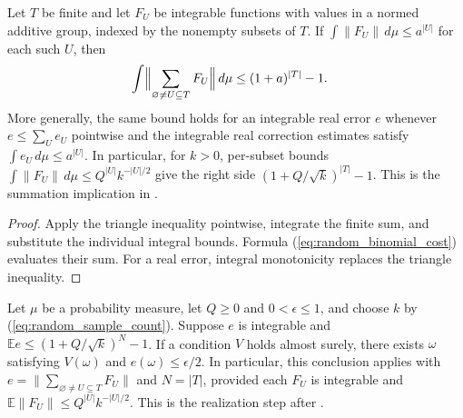 \begin{theorem}\label{thm:random_expected_corrections}
    \leanok
    Let $T$ be finite and let $F_U$ be integrable functions with values in a
    normed additive group, indexed by the nonempty subsets of $T$.
    If $\int\lVert F_U\rVert\,d\mu\leq a^{|U|}$ for each such $U$, then
    \begin{align}
        \int\Bigl\lVert\sum_{\varnothing\neq U\subseteq T}F_U\Bigr\rVert\,d\mu
         & \leq(1+a)^{|T|}-1.
        \label{eq:random_expected_corrections}
    \end{align}
    More generally, the same bound holds for an integrable real error $e$
    whenever $e\leq\sum_U e_U$ pointwise and the integrable real correction
    estimates satisfy $\int e_U\,d\mu\leq a^{|U|}$.
    In particular, for $k>0$, per-subset bounds
    $\int\lVert F_U\rVert\,d\mu\leq Q^{|U|}k^{-|U|/2}$ give the right side
    $(1+Q/\sqrt{k})^{|T|}-1$.
    This is the summation implication in
    \cite[Equation~(5.19)]{OpenAI2026PolynomialPEPS}.
\end{theorem}

\begin{proof}\leanok
    Apply the triangle inequality pointwise, integrate the finite sum, and
    substitute the individual integral bounds. Formula
    (\ref{eq:random_binomial_cost}) evaluates their sum. For a real error,
    integral monotonicity replaces the triangle inequality.
\end{proof}

\begin{theorem}
    \label{thm:random_realization}
    \leanok
    Let $\mu$ be a probability measure, let $Q\geq0$ and
    $0<\epsilon\leq1$, and choose $k$ by (\ref{eq:random_sample_count}).
    Suppose $e$ is integrable and
    $\mathbb E e\leq(1+Q/\sqrt{k})^N-1$.
    If a condition $V$ holds almost surely, there exists $\omega$ satisfying
    $V(\omega)$ and $e(\omega)\leq\epsilon/2$.
    In particular, this conclusion applies with
    $e=\lVert\sum_{\varnothing\neq U\subseteq T}F_U\rVert$ and $N=|T|$,
    provided each $F_U$ is integrable and
    $\mathbb E\lVert F_U\rVert\leq Q^{|U|}k^{-|U|/2}$.
    This is the realization step after
    \cite[Equation~(5.19)]{OpenAI2026PolynomialPEPS}.
\end{theorem}

